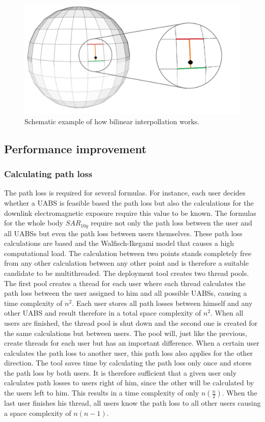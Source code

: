 \begin{figure}[H]
\centering
  \includegraphics[width=\textwidth/3*2]{../images/3Dimages/globev2.jpg}
  \caption{Schematic example of how bilinear interpollation works.}
  \label{fig:globe}
\end{figure}

\subsection{Performance improvement}
\subsubsection{Calculating path loss}
The path loss is required for several formulas. For instance, each user decides whether a \gls{UABS} is feasible based 
the path loss but also the calculations for the downlink electromagnetic 
exposure require this value to be known. The formulas for the whole body $SAR_{10g}$ require not only the path loss between the user
and all \gls{UABS}s but even the path loss between users themselves. These path loss calculations are based and the Walfisch-Ikegami 
model that causes a high computational load. The calculation between two points stands completely free from
any other calculation between any other point and is therefore a suitable candidate to be multithreaded. The deployment tool creates two thread pools.
The first pool creates a thread for each user where each thread calculates the path loss between the user assigned to him and all possible \gls{UABS}s,
 causing a time complexity of $n^2$.
Each user stores all path losses between himself and any other \gls{UABS} and result therefore in a total space complexity of $n^2$.
When all users are finished, the thread pool is shut down and the second one is created for the same calculations but between users.
The pool will, just like the previous, create threads for each user but has an important difference.
When a certain user calculates the path loss to another user, this path loss also applies for the other direction. The tool saves time by calculating the path loss only 
once and stores the path loss by both users. It is therefore sufficient that a given user only calculates path losses to users right of him, since the other will 
be calculated by the users left to him. This results in a time complexity of only $n(\frac{n}{2})$. When the last user finishes his thread, all users know the path loss to all other users causing 
a space complexity of $n(n-1)$.

